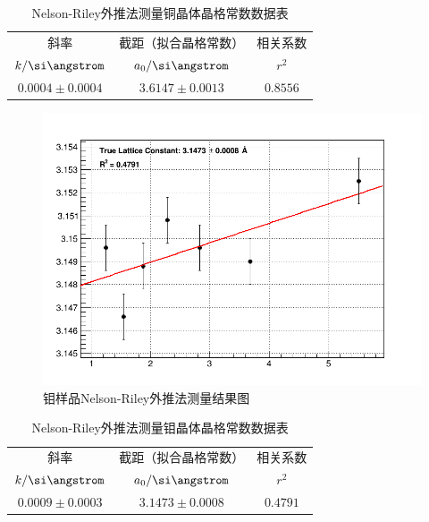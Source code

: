 \documentclass{thuemp}
\begin{document}
\begin{table}[H]
    \centering
    \captionnamefont{\wuhao\bf\heiti}
    \captiontitlefont{\wuhao\bf\heiti}
    \caption{Nelson-Riley外推法测量铜晶体晶格常数数据表}
    \label{tab:cu_xrd_extrapol}
    \liuhao
    \begin{tabular}{ccc}
        \toprule
        斜率 & 截距（拟合晶格常数） & 相关系数 \\
        $k/\text{\si\angstrom}$ & $a_0/\text{\si\angstrom}$ & $r^2$\\
        \midrule
        $0.0004 \pm 0.0004$ & $3.6147 \pm 0.0013$ & $0.8556$ \\
        \bottomrule
    \end{tabular}
\end{table}

\begin{figure}[H]
    \centering
    \includegraphics[width=0.8\linewidth]{../Data/Fit_mo_xrd.png}
    \caption{钼样品Nelson-Riley外推法测量结果图}
    \label{fig:mo_xrd_extrapol}
\end{figure}

\begin{table}[H]
    \centering
    \captionnamefont{\wuhao\bf\heiti}
    \captiontitlefont{\wuhao\bf\heiti}
    \caption{Nelson-Riley外推法测量钼晶体晶格常数数据表}
    \label{tab:mo_xrd_extrapol}
    \liuhao
    \begin{tabular}{ccc}
        \toprule
        斜率 & 截距（拟合晶格常数） & 相关系数 \\
        $k/\text{\si\angstrom}$ & $a_0/\text{\si\angstrom}$ & $r^2$\\
        \midrule
        $0.0009 \pm 0.0003$ & $3.1473 \pm 0.0008$ & $0.4791$ \\
        \bottomrule
    \end{tabular}
\end{table}
\end{document}
